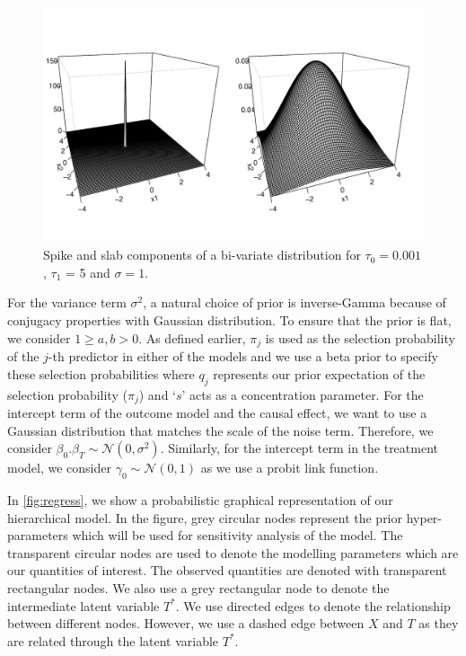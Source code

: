 \documentclass[oribibl]{llncs}
\newcommand{\normal}{\mathcal{N}}
\begin{document}
\begin{figure}[h]
	\begin{center}
		\includegraphics[width = 0.95\linewidth]{spike_slab_bi.pdf}
	\end{center}
	\caption{Spike and slab components of a bi-variate distribution for $\tau_0 = 0.001$, $\tau_1$ = 5 and $\sigma=1$.}
	\label{fig:ssbl}
\end{figure}

For the variance term $\sigma^2$, a natural choice of prior is inverse-Gamma 
because of conjugacy properties with Gaussian distribution. To
ensure that the prior is flat, we consider $1\ge a, b >0$.
As defined earlier, $\pi_j$ is used as the selection probability
of the $j$-th predictor in either of the models and we use a beta prior to specify 
these selection probabilities where  $q_j$ represents our prior expectation of the selection probability ($\pi_j$) and `$s$' acts as 
a concentration parameter.
For the intercept term of the outcome model and the causal effect, 
we want to use a Gaussian distribution that matches the scale of the noise term.
Therefore, we consider $\beta_0. \beta_T\sim \normal(0,\sigma^2)$. 
Similarly, for the intercept term in the treatment model, we consider 
$\gamma_0\sim \normal(0,1)$ as we use a probit link function. 

In \cref{fig:regress}, we show a probabilistic graphical representation
of our hierarchical model. In the figure, grey circular nodes represent the
prior hyper-parameters which will be used for sensitivity analysis
of the model. The transparent circular nodes are used to denote
the modelling parameters which are our quantities of interest. 
The observed quantities are denoted with transparent rectangular
nodes. We also use a grey rectangular node to denote the intermediate
latent variable $T^*$. We use directed edges to denote the
relationship between different nodes. However, we use a dashed
edge between $X$ and $T$ as they are related through the latent
variable $T^*$. 
\end{document}
